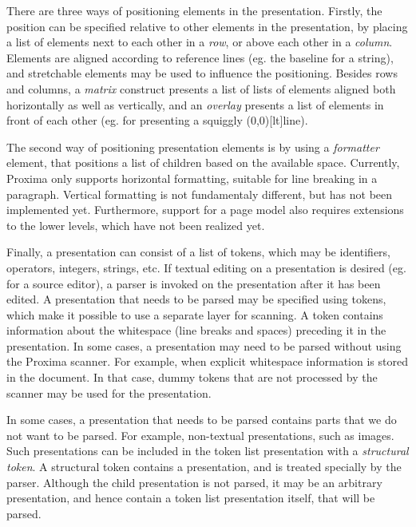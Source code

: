 There are three ways of positioning elements in the presentation. Firstly, the position can be specified relative to other elements in the presentation, by placing a list of elements next to each other in a {\em row}, or above each other in a {\em column}. Elements are aligned according to reference lines (eg. the baseline for a string), and stretchable elements may be used to influence the positioning. Besides rows and columns, a {\em matrix} construct presents a list of lists of elements aligned both horizontally as well as vertically, and an {\em overlay} presents a list of elements in front of each other (eg. for presenting a squiggly \makebox(0,0)[lt]{}line). 

The second way of positioning presentation elements is by using a {\em formatter} element, that positions a list of children based on the available space. Currently, Proxima only supports horizontal formatting, suitable for line breaking in a paragraph. Vertical formatting is not fundamentaly different, but has not been implemented yet. Furthermore, support for a page model also requires extensions to the lower levels, which have not been realized yet.

Finally, a presentation can consist of a list of tokens, which may be identifiers, operators, integers, strings, etc. If textual editing on a presentation is desired (eg. for a source editor), a parser is invoked on the presentation after it has been edited. A presentation that needs to be parsed may be specified using tokens, which make it possible to use a separate layer for scanning. A token contains information about the whitespace (line breaks and spaces) preceding it in the presentation. In some cases, a presentation may need to be parsed without using the Proxima scanner. For example, when explicit whitespace information is stored in the document. In that case, dummy tokens that are not processed by the scanner may be used for the presentation.

In some cases, a presentation that needs to be parsed contains parts that we do not want to be parsed. For example, non-textual presentations, such as images. Such presentations can be included in the token list presentation with a {\em structural token}. A structural token contains a presentation, and is treated specially by the parser. Although the child presentation is not parsed, it may be an arbitrary presentation, and hence contain a token list presentation itself, that will be parsed.

